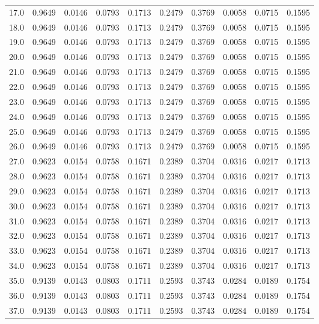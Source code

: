 \begin{longtable}{lrrrrrrrrr}
17.0 & 0.9649 & 0.0146 & 0.0793 & 0.1713 & 0.2479 & 0.3769 & 0.0058 & 0.0715 & 0.1595 \\
18.0 & 0.9649 & 0.0146 & 0.0793 & 0.1713 & 0.2479 & 0.3769 & 0.0058 & 0.0715 & 0.1595 \\
19.0 & 0.9649 & 0.0146 & 0.0793 & 0.1713 & 0.2479 & 0.3769 & 0.0058 & 0.0715 & 0.1595 \\
20.0 & 0.9649 & 0.0146 & 0.0793 & 0.1713 & 0.2479 & 0.3769 & 0.0058 & 0.0715 & 0.1595 \\
21.0 & 0.9649 & 0.0146 & 0.0793 & 0.1713 & 0.2479 & 0.3769 & 0.0058 & 0.0715 & 0.1595 \\
22.0 & 0.9649 & 0.0146 & 0.0793 & 0.1713 & 0.2479 & 0.3769 & 0.0058 & 0.0715 & 0.1595 \\
23.0 & 0.9649 & 0.0146 & 0.0793 & 0.1713 & 0.2479 & 0.3769 & 0.0058 & 0.0715 & 0.1595 \\
24.0 & 0.9649 & 0.0146 & 0.0793 & 0.1713 & 0.2479 & 0.3769 & 0.0058 & 0.0715 & 0.1595 \\
25.0 & 0.9649 & 0.0146 & 0.0793 & 0.1713 & 0.2479 & 0.3769 & 0.0058 & 0.0715 & 0.1595 \\
26.0 & 0.9649 & 0.0146 & 0.0793 & 0.1713 & 0.2479 & 0.3769 & 0.0058 & 0.0715 & 0.1595 \\
27.0 & 0.9623 & 0.0154 & 0.0758 & 0.1671 & 0.2389 & 0.3704 & 0.0316 & 0.0217 & 0.1713 \\
28.0 & 0.9623 & 0.0154 & 0.0758 & 0.1671 & 0.2389 & 0.3704 & 0.0316 & 0.0217 & 0.1713 \\
29.0 & 0.9623 & 0.0154 & 0.0758 & 0.1671 & 0.2389 & 0.3704 & 0.0316 & 0.0217 & 0.1713 \\
30.0 & 0.9623 & 0.0154 & 0.0758 & 0.1671 & 0.2389 & 0.3704 & 0.0316 & 0.0217 & 0.1713 \\
31.0 & 0.9623 & 0.0154 & 0.0758 & 0.1671 & 0.2389 & 0.3704 & 0.0316 & 0.0217 & 0.1713 \\
32.0 & 0.9623 & 0.0154 & 0.0758 & 0.1671 & 0.2389 & 0.3704 & 0.0316 & 0.0217 & 0.1713 \\
33.0 & 0.9623 & 0.0154 & 0.0758 & 0.1671 & 0.2389 & 0.3704 & 0.0316 & 0.0217 & 0.1713 \\
34.0 & 0.9623 & 0.0154 & 0.0758 & 0.1671 & 0.2389 & 0.3704 & 0.0316 & 0.0217 & 0.1713 \\
35.0 & 0.9139 & 0.0143 & 0.0803 & 0.1711 & 0.2593 & 0.3743 & 0.0284 & 0.0189 & 0.1754 \\
36.0 & 0.9139 & 0.0143 & 0.0803 & 0.1711 & 0.2593 & 0.3743 & 0.0284 & 0.0189 & 0.1754 \\
37.0 & 0.9139 & 0.0143 & 0.0803 & 0.1711 & 0.2593 & 0.3743 & 0.0284 & 0.0189 & 0.1754 \\

\end{longtable}
